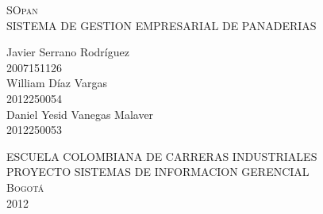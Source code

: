 \begin{titlepage}
\setlength{\parindent}{0pt} \setlength{\parskip}{0pt}

\begin{center}

\textsc{\large SOpan}\\[0.2cm]
{\large SISTEMA DE GESTION EMPRESARIAL DE PANADERIAS}\\[1cm]
\end{center}

\begin{center}

\end{center}

\begin{center}

\vfill
{\Large Javier Serrano Rodr\'iguez\\2007151126\\William D\'iaz Vargas\\2012250054\\Daniel Yesid Vanegas Malaver\\2012250053\\[0.4cm]}
\end{center}
\vfill
\begin{center}
\large \textsc{ESCUELA COLOMBIANA DE CARRERAS INDUSTRIALES\\PROYECTO SISTEMAS DE INFORMACION GERENCIAL\\Bogot\'a\\2012}
\end{center}
\end{titlepage}